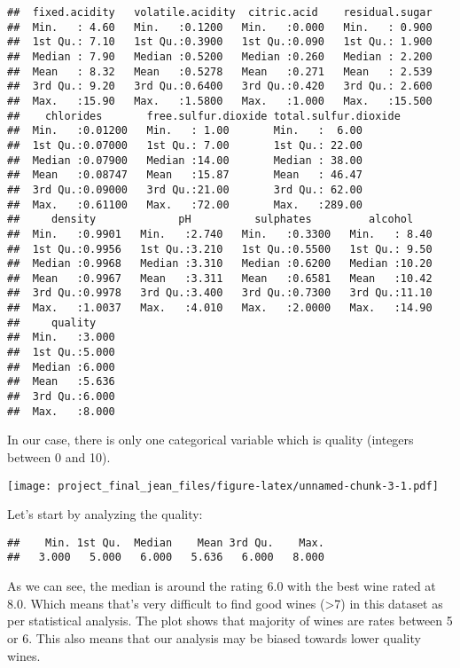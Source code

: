 \documentclass[]{article}
\begin{document}
\begin{verbatim}
##  fixed.acidity   volatile.acidity  citric.acid    residual.sugar  
##  Min.   : 4.60   Min.   :0.1200   Min.   :0.000   Min.   : 0.900  
##  1st Qu.: 7.10   1st Qu.:0.3900   1st Qu.:0.090   1st Qu.: 1.900  
##  Median : 7.90   Median :0.5200   Median :0.260   Median : 2.200  
##  Mean   : 8.32   Mean   :0.5278   Mean   :0.271   Mean   : 2.539  
##  3rd Qu.: 9.20   3rd Qu.:0.6400   3rd Qu.:0.420   3rd Qu.: 2.600  
##  Max.   :15.90   Max.   :1.5800   Max.   :1.000   Max.   :15.500  
##    chlorides       free.sulfur.dioxide total.sulfur.dioxide
##  Min.   :0.01200   Min.   : 1.00       Min.   :  6.00      
##  1st Qu.:0.07000   1st Qu.: 7.00       1st Qu.: 22.00      
##  Median :0.07900   Median :14.00       Median : 38.00      
##  Mean   :0.08747   Mean   :15.87       Mean   : 46.47      
##  3rd Qu.:0.09000   3rd Qu.:21.00       3rd Qu.: 62.00      
##  Max.   :0.61100   Max.   :72.00       Max.   :289.00      
##     density             pH          sulphates         alcohol     
##  Min.   :0.9901   Min.   :2.740   Min.   :0.3300   Min.   : 8.40  
##  1st Qu.:0.9956   1st Qu.:3.210   1st Qu.:0.5500   1st Qu.: 9.50  
##  Median :0.9968   Median :3.310   Median :0.6200   Median :10.20  
##  Mean   :0.9967   Mean   :3.311   Mean   :0.6581   Mean   :10.42  
##  3rd Qu.:0.9978   3rd Qu.:3.400   3rd Qu.:0.7300   3rd Qu.:11.10  
##  Max.   :1.0037   Max.   :4.010   Max.   :2.0000   Max.   :14.90  
##     quality     
##  Min.   :3.000  
##  1st Qu.:5.000  
##  Median :6.000  
##  Mean   :5.636  
##  3rd Qu.:6.000  
##  Max.   :8.000
\end{verbatim}

In our case, there is only one categorical variable which is quality
(integers between 0 and 10).

\texttt{[image: project\_final\_jean\_files/figure-latex/unnamed-chunk-3-1.pdf]}

Let's start by analyzing the quality:

\begin{verbatim}
##    Min. 1st Qu.  Median    Mean 3rd Qu.    Max. 
##   3.000   5.000   6.000   5.636   6.000   8.000
\end{verbatim}

As we can see, the median is around the rating 6.0 with the best wine
rated at 8.0. Which means that's very difficult to find good wines
(\textgreater{}7) in this dataset as per statistical analysis. The plot
shows that majority of wines are rates between 5 or 6. This also means
that our analysis may be biased towards lower quality wines.
\end{document}
